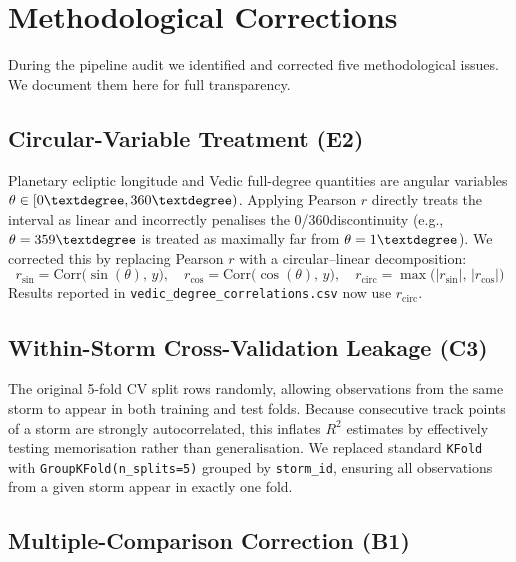 \documentclass[12pt,a4paper]{article}
\begin{document}
\section{Methodological Corrections}
\label{sec:corrections}

During the pipeline audit we identified and corrected five methodological issues.
We document them here for full transparency.

\subsection{Circular-Variable Treatment (E2)}

Planetary ecliptic longitude and Vedic full-degree quantities are angular variables
$\theta \in [0\textdegree, 360\textdegree)$.
Applying Pearson $r$ directly treats the interval as linear and incorrectly penalises
the 0\textdegree/360\textdegree discontinuity (e.g., $\theta = 359\textdegree$ is
treated as maximally far from $\theta = 1\textdegree$).
We corrected this by replacing Pearson $r$ with a circular--linear decomposition:
\begin{equation}
  r_{\sin} = \mathrm{Corr}\bigl(\sin(\theta),\, y\bigr), \quad
  r_{\cos} = \mathrm{Corr}\bigl(\cos(\theta),\, y\bigr), \quad
  r_{\text{circ}} = \max\!\bigl(|r_{\sin}|,\, |r_{\cos}|\bigr)
\end{equation}
Results reported in \texttt{vedic\_degree\_correlations.csv} now use $r_{\text{circ}}$.

\subsection{Within-Storm Cross-Validation Leakage (C3)}

The original 5-fold CV split rows randomly, allowing observations from the same storm
to appear in both training and test folds. Because consecutive track points of a storm
are strongly autocorrelated, this inflates $R^2$ estimates by effectively testing
memorisation rather than generalisation. We replaced standard \texttt{KFold} with
\texttt{GroupKFold(n\_splits=5)} grouped by \texttt{storm\_id}, ensuring all
observations from a given storm appear in exactly one fold.

\subsection{Multiple-Comparison Correction (B1)}
\end{document}
